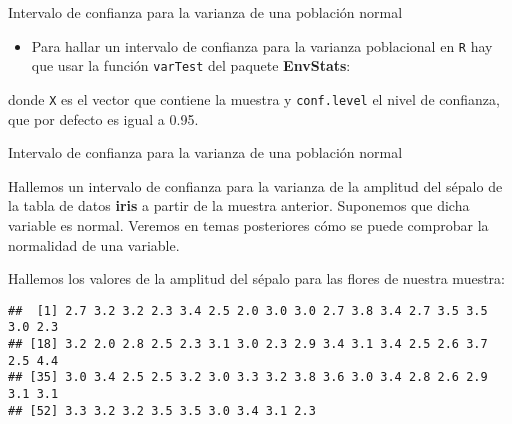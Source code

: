 \documentclass[ignorenonframetext,]{beamer}
\newenvironment{Shaded}{\begin{snugshade}}{\end{snugshade}}
\newcommand{\DataTypeTok}[1]{\textcolor[rgb]{0.13,0.29,0.53}{#1}}
\newcommand{\KeywordTok}[1]{\textcolor[rgb]{0.13,0.29,0.53}{\textbf{#1}}}
\newcommand{\NormalTok}[1]{#1}
\newcommand{\OperatorTok}[1]{\textcolor[rgb]{0.81,0.36,0.00}{\textbf{#1}}}
\providecommand{\tightlist}{%
  \setlength{\itemsep}{0pt}\setlength{\parskip}{0pt}}
\begin{document}
\begin{frame}[fragile]{Intervalo de confianza para la varianza de una
población normal}
\protect\hypertarget{intervalo-de-confianza-para-la-varianza-de-una-poblacion-normal-1}{}

\begin{itemize}
\tightlist
\item
  Para hallar un intervalo de confianza para la varianza poblacional en
  \texttt{R} hay que usar la función \texttt{varTest} del paquete
  \textbf{EnvStats}:
\end{itemize}

\begin{Shaded}
\end{Shaded}

donde \texttt{X} es el vector que contiene la muestra y
\texttt{conf.level} el nivel de confianza, que por defecto es igual a
0.95.

\end{frame}

\begin{frame}[fragile]{Intervalo de confianza para la varianza de una
población normal}
\protect\hypertarget{intervalo-de-confianza-para-la-varianza-de-una-poblacion-normal-2}{}

Hallemos un intervalo de confianza para la varianza de la amplitud del
sépalo de la tabla de datos \textbf{iris} a partir de la muestra
anterior. Suponemos que dicha variable es normal. Veremos en temas
posteriores cómo se puede comprobar la normalidad de una variable.

Hallemos los valores de la amplitud del sépalo para las flores de
nuestra muestra:

\begin{Shaded}
\end{Shaded}

\begin{verbatim}
##  [1] 2.7 3.2 3.2 2.3 3.4 2.5 2.0 3.0 3.0 2.7 3.8 3.4 2.7 3.5 3.5 3.0 2.3
## [18] 3.2 2.0 2.8 2.5 2.3 3.1 3.0 2.3 2.9 3.4 3.1 3.4 2.5 2.6 3.7 2.5 4.4
## [35] 3.0 3.4 2.5 2.5 3.2 3.0 3.3 3.2 3.8 3.6 3.0 3.4 2.8 2.6 2.9 3.1 3.1
## [52] 3.3 3.2 3.2 3.5 3.5 3.0 3.4 3.1 2.3
\end{verbatim}

\end{frame}
\end{document}
